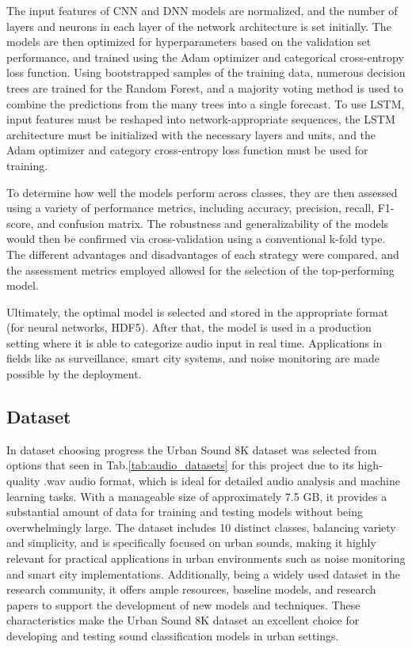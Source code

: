 \documentclass[conference]{IEEEtran}
\begin{document}
The input features of CNN and DNN models are normalized, and the number of layers and neurons in each layer of the network architecture is set initially. The models are then optimized for hyperparameters based on the validation set performance, and trained using the Adam optimizer and categorical cross-entropy loss function. Using bootstrapped samples of the training data, numerous decision trees are trained for the Random Forest, and a majority voting method is used to combine the predictions from the many trees into a single forecast. To use LSTM, input features must be reshaped into network-appropriate sequences, the LSTM architecture must be initialized with the necessary layers and units, and the Adam optimizer and category cross-entropy loss function must be used for training.

To determine how well the models perform across classes, they are then assessed using a variety of performance metrics, including accuracy, precision, recall, F1-score, and confusion matrix. The robustness and generalizability of the models would then be confirmed via cross-validation using a conventional k-fold type. The different advantages and disadvantages of each strategy were compared, and the assessment metrics employed allowed for the selection of the top-performing model.

Ultimately, the optimal model is selected and stored in the appropriate format (for neural networks, HDF5). After that, the model is used in a production setting where it is able to categorize audio input in real time. Applications in fields like as surveillance, smart city systems, and noise monitoring are made possible by the deployment.








\subsection{Dataset}
In dataset choosing progress the Urban Sound 8K dataset was selected from options that seen in Tab.\ref{tab:audio_datasets} for this project due to its high-quality .wav audio format,  which is ideal for detailed audio analysis and machine learning tasks. With a manageable size of approximately 7.5 GB, it provides a substantial amount of data for training and testing models without being overwhelmingly large. The dataset includes 10 distinct classes, balancing variety and simplicity, and is specifically focused on urban sounds, making it highly relevant for practical applications in urban environments such as noise monitoring and smart city implementations. Additionally, being a widely used dataset in the research community, it offers ample resources, baseline models, and research papers to support the development of new models and techniques. These characteristics make the Urban Sound 8K dataset an excellent choice for developing and testing sound classification models in urban settings.
\end{document}
